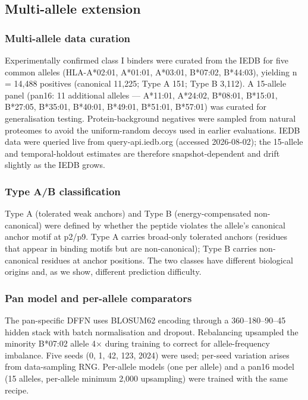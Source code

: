 \begin{methods}
\subsection{Multi-allele extension}
\subsubsection{Multi-allele data curation}
Experimentally confirmed class I binders were curated from the IEDB \citep{Vita19} for five common alleles (HLA-A*02:01, A*01:01, A*03:01, B*07:02, B*44:03), yielding n = 14,488 positives (canonical 11,225; Type A 151; Type B 3,112). A 15-allele panel (pan16: 11 additional alleles --- A*11:01, A*24:02, B*08:01, B*15:01, B*27:05, B*35:01, B*40:01, B*49:01, B*51:01, B*57:01) was curated for generalisation testing. Protein-background negatives were sampled from natural proteomes to avoid the uniform-random decoys used in earlier evaluations. IEDB data were queried live from query-api.iedb.org (accessed 2026-08-02); the 15-allele and temporal-holdout estimates are therefore snapshot-dependent and drift slightly as the IEDB grows.

\subsubsection{Type A/B classification}
Type A (tolerated weak anchors) and Type B (energy-compensated non-canonical) were defined by whether the peptide violates the allele's canonical anchor motif at p2/p9. Type A carries broad-only tolerated anchors (residues that appear in binding motifs but are non-canonical); Type B carries non-canonical residues at anchor positions. The two classes have different biological origins and, as we show, different prediction difficulty.

\subsubsection{Pan model and per-allele comparators}
The pan-specific DFFN uses BLOSUM62 encoding \citep{Henikoff92} through a 360--180--90--45 hidden stack with batch normalisation and dropout. Rebalancing upsampled the minority B*07:02 allele 4$\times$ during training to correct for allele-frequency imbalance. Five seeds (0, 1, 42, 123, 2024) were used; per-seed variation arises from data-sampling RNG. Per-allele models (one per allele) and a pan16 model (15 alleles, per-allele minimum 2,000 upsampling) were trained with the same recipe.


\end{methods}

